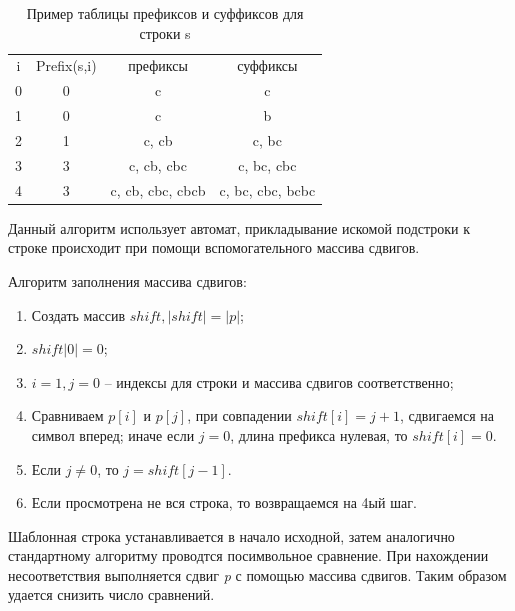 \documentclass[a4paper,12pt]{article}
\begin{document}
\begin{table}[h]
	    		\caption{Пример таблицы префиксов и суффиксов для строки s}
	    		\begin{center}
	    			\begin{tabular}{|c|c|c|c|}
	    			\hline
	    			i&Prefix(s,i)&префиксы&суффиксы\\
	    			0&0&c&c\\
	    			1&0&c&b\\
	    			2&1&c, cb&c, bc\\
	    			3&3&c, cb, cbc&c, bc, cbc\\
	    			4&3&c, cb, cbc, cbcb&c, bc, cbc, bcbc\\
	    			\hline
	    			\end{tabular}
	    			\label{T:t1}	
	    		\end{center}
\end{table}
\newpage
Данный алгоритм использует автомат, прикладывание искомой подстроки к строке происходит при помощи вспомогательного массива сдвигов.

Алгоритм заполнения массива сдвигов:
\begin{enumerate}
\item Создать массив $shift, |shift| = |p|$;
\item $shift|0| = 0$;
\item $i=1,j=0$ -- индексы для строки и массива сдвигов соответственно;
\item Сравниваем $p[i]$ и $p[j]$, при совпадении $shift[i] = j+1$, сдвигаемся на символ вперед; иначе если $j = 0$, длина префикса нулевая, то $shift[i] = 0$.
\item Если $j \neq 0$, то $j = shift[j-1]$.
\item Если просмотрена не вся строка, то возвращаемся на 4ый шаг.
\end{enumerate}

Шаблонная строка устанавливается в начало исходной, затем аналогично стандартному алгоритму проводтся посимвольное сравнение. При нахождении несоответствия выполняется сдвиг \textit{p} с помощью массива сдвигов. Таким образом удается снизить число сравнений.
\end{document}
